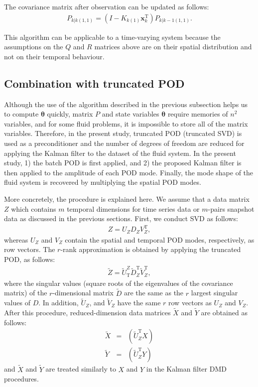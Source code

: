 \documentclass[aip,graphicx]{revtex4-1}
\begin{document}
The covariance matrix after observation can be updated as follows:
\begin{eqnarray}
	P_{k|k\left(1,1\right)} = \left( I - K_{k\left(1\right)} \bm{x}_k^\text{T} \right)P_{k|k-1\left(1,1\right)}.\label{eq:updateP11}
\end{eqnarray}


 This algorithm can be applicable to a time-varying system because the assumptions on the $Q$ and $R$ matrices above are on their spatial distribution and not on their temporal behaviour. 

\subsection{Combination with truncated POD}
\label{sec:POD}
Although the use of the algorithm described in the previous subsection helps us to compute $\bm{\theta}$ quickly, matrix $P$ and state variables $\bm{\theta}$ require memories of $n^2$ variables, and for some fluid problems, it is impossible to store all of the matrix variables. Therefore, in the present study, truncated POD (truncated SVD) is used as a preconditioner and the number of degrees of freedom are reduced for applying the Kalman filter to the dataset of the fluid system. In the present study, 1) the batch POD is first applied, and 2) the proposed Kalman filter is then applied to the amplitude of each POD mode. Finally, the mode shape of the fluid system is recovered by multiplying the spatial POD modes.　

More concretely, the procedure is explained here. We assume that a data matrix $Z$ which contains $m$ temporal dimensions for time series data or $m$-pairs snapshot data as discussed in the previous sections.
First, we conduct SVD as follows:
\begin{eqnarray}
Z=U_ZD_ZV_Z^\text{T},\label{eq:svds}
\end{eqnarray}
whereas $U_Z$ and $V_Z$ contain the spatial and temporal POD modes, respectively, as row vectors. 
The $r$-rank approximation is obtained by applying the truncated POD, as follows:
\begin{eqnarray}
\tilde Z= \tilde U_\text{T}^Z \tilde D^\text{T}_Z \tilde V^\text{T}_{Z},
\end{eqnarray}
where the singular values (square roots of the eigenvalues of the covariance matrix) of the $r$-dimensional matrix $\tilde D$ are the same as the $r$ largest singular values of $D$. In addition, $\tilde U_Z$, and $\tilde V_Z$ have the same $r$ row vectors as $U_Z$ and $V_Z$. After this procedure, reduced-dimension data matrices $\tilde X$ and $\tilde Y$ are obtained as follows:
\begin{eqnarray}
\tilde X&=&\left(\tilde{U}_{Z}^\text{T} X\right)\label{eq:xtilde}\\
\tilde Y&=&\left(\tilde{U}_{Z}^\text{T} Y\right)\label{eq:ytilde}
\end{eqnarray}
and $\tilde X$ and $\tilde Y$ are treated similarly to $X$ and $Y$ in the Kalman filter DMD procedures. 
\end{document}
